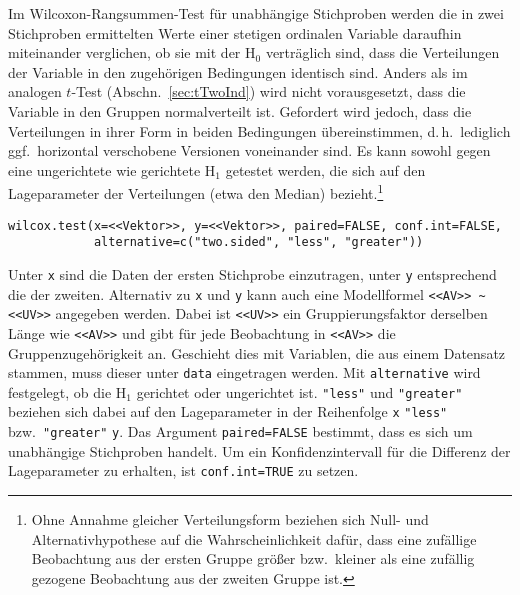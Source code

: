 Im Wilcoxon-Rangsummen-Test für unabhängige Stichproben werden die in zwei Stichproben ermittelten Werte einer stetigen ordinalen Variable daraufhin miteinander verglichen, ob sie mit der $\text{H}_{0}$ verträglich sind, dass die Verteilungen der Variable in den zugehörigen Bedingungen identisch sind. Anders als im analogen $t$-Test (Abschn.\ \ref{sec:tTwoInd}) wird nicht vorausgesetzt, dass die Variable in den Gruppen normalverteilt ist. Gefordert wird jedoch, dass die Verteilungen in ihrer Form in beiden Bedingungen übereinstimmen, d.\,h.\ lediglich ggf.\ horizontal verschobene Versionen voneinander sind. Es kann sowohl gegen eine ungerichtete wie gerichtete $\text{H}_{1}$ getestet werden, die sich auf den Lageparameter der Verteilungen (etwa den Median) bezieht.\footnote{Ohne Annahme gleicher Verteilungsform beziehen sich Null- und Alternativhypothese auf die Wahrscheinlichkeit dafür, dass eine zufällige Beobachtung aus der ersten Gruppe größer bzw.\ kleiner als eine zufällig gezogene Beobachtung aus der zweiten Gruppe ist.}
\begin{lstlisting}
wilcox.test(x=<<Vektor>>, y=<<Vektor>>, paired=FALSE, conf.int=FALSE,
            alternative=c("two.sided", "less", "greater"))
\end{lstlisting}

Unter \lstinline!x! sind die Daten der ersten Stichprobe einzutragen, unter \lstinline!y! entsprechend die der zweiten. Alternativ zu \lstinline!x! und \lstinline!y! kann auch eine Modellformel \lstinline!<<AV>> ~ <<UV>>! angegeben werden. Dabei ist \lstinline!<<UV>>! ein Gruppierungsfaktor derselben Länge wie \lstinline!<<AV>>! und gibt für jede Beobachtung in \lstinline!<<AV>>! die Gruppenzugehörigkeit an. Geschieht dies mit Variablen, die aus einem Datensatz stammen, muss dieser unter \lstinline!data! eingetragen werden. Mit \lstinline!alternative! wird festgelegt, ob die $\text{H}_{1}$ gerichtet oder ungerichtet ist. \lstinline!"less"! und \lstinline!"greater"! beziehen sich dabei auf den Lageparameter in der Reihenfolge \lstinline!x! \lstinline!"less"! bzw.\ \lstinline!"greater"! \lstinline!y!. Das Argument \lstinline!paired=FALSE! bestimmt, dass es sich um unabhängige Stichproben handelt. Um ein Konfidenzintervall für die Differenz der Lageparameter zu erhalten, ist \lstinline!conf.int=TRUE! zu setzen.

